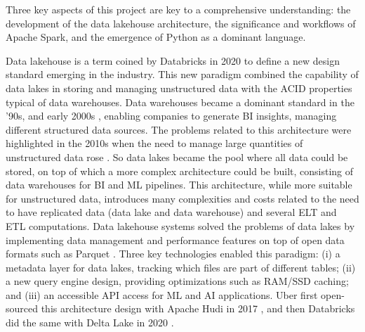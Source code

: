 Three key aspects of this project are key to a comprehensive understanding: the development of the data lakehouse architecture, the significance and workflows of Apache Spark, and the emergence of Python as a dominant language.

Data lakehouse is a term coined by Databricks in 2020 \cite{WhatLakehouse2020} to define a new design standard emerging in the industry. This new paradigm combined the capability of data lakes in storing and managing unstructured data with the \gls{ACID} properties typical of data warehouses.
Data warehouses became a dominant standard in the '90s, and early 2000s \cite{chaudhuriOverviewDataWarehousing1997}, enabling companies to generate \gls{BI} insights, managing different structured data sources. The problems related to this architecture were highlighted in the 2010s when the need to manage large quantities of unstructured data rose \cite{ederUnstructuredData802008}. 
So data lakes became the pool where all data could be stored, on top of which a more complex architecture could be built, consisting of data warehouses for \gls{BI} and \gls{ML} pipelines.
This architecture, while more suitable for unstructured data, introduces many complexities and costs related to the need to have replicated data (data lake and data warehouse) and several \gls{ELT} and \gls{ETL} computations.
Data lakehouse systems solved the problems of data lakes by implementing data management and performance features on top of open data formats such as Parquet \cite{DremelMadeSimple}. Three key technologies enabled this paradigm: (i) a metadata layer for data lakes, tracking which files are part of different tables; (ii) a new query engine design, providing optimizations such as \gls{RAM}/\gls{SSD} caching; and (iii) an accessible \gls{API} access for \gls{ML} and \gls{AI} applications. Uber first open-sourced this architecture design with Apache Hudi in 2017 \cite{rajaperumalUberEngineeringIncremental2017}, and then Databricks did the same with Delta Lake in 2020 \cite{armbrustDeltaLakeHighperformance2020}.

